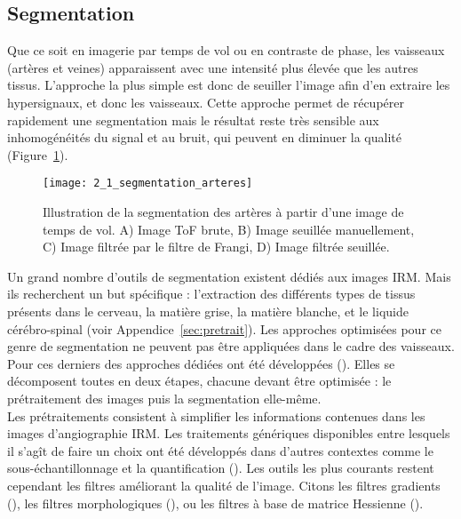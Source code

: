 \subsection{Segmentation}
Que ce soit en imagerie par temps de vol ou en contraste de phase, les vaisseaux (artères et veines) apparaissent avec une intensité plus élevée que les autres tissus. L’approche la plus simple est donc de seuiller l’image afin d’en extraire les hypersignaux, et donc les vaisseaux. Cette approche permet de récupérer rapidement une segmentation mais le résultat reste très sensible aux inhomogénéités du signal et au bruit, qui peuvent en diminuer la qualité (Figure~\ref{fig:2_1_segmentation_arteres}).\\
\begin{figure}[!t]
\centering
\texttt{[image: 2\_1\_segmentation\_arteres]}
\caption{Illustration de la segmentation des artères à partir d’une image de temps de vol. A) Image ToF brute, B) Image seuillée manuellement, C) Image filtrée par le filtre de Frangi, D) Image filtrée seuillée.}
\label{fig:2_1_segmentation_arteres}	
\end{figure}
Un grand nombre d’outils de segmentation existent dédiés aux images IRM. Mais ils recherchent un but spécifique : l’extraction des différents types de tissus présents dans le cerveau, la matière grise, la matière blanche, et le liquide cérébro-spinal (voir Appendice~\ref{sec:pretrait}).  Les approches optimisées pour ce genre de segmentation ne peuvent pas être appliquées dans le cadre des vaisseaux. Pour ces derniers des approches dédiées ont été développées (\cite{Lesage2009}). Elles se décomposent toutes en deux étapes, chacune devant être optimisée : le prétraitement des images puis la segmentation elle-même.\\
Les prétraitements consistent à simplifier les informations contenues dans les images d’angiographie IRM. Les traitements génériques disponibles entre lesquels il s’agît de faire un choix ont été développés dans d’autres contextes comme le sous-échantillonnage et la quantification (\cite{Tschirren2005}). Les outils les plus courants restent cependant les filtres améliorant la qualité de l’image. Citons les filtres gradients  (\cite{Koller1995}), les filtres morphologiques (\cite{Wilkinson2001}), ou les filtres à base de matrice Hessienne (\cite{Frangi1998}). \\
